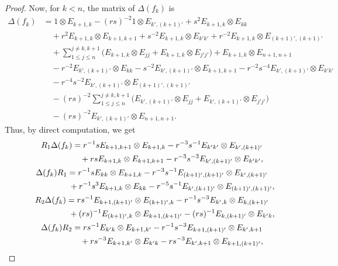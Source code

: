 \documentclass[10pt,a4paper]{amsart}
\numberwithin{equation}{section}
\begin{document}
\begin{proof}
Now, for $k < n$, the matrix of $\Delta(f_{k})$ is
\begin{align*}
 \Delta(f_{k}) &{}= 1 \otimes E_{k + 1,k} - (rs)^{-2}1 \otimes E_{k',(k + 1)'} + s^{2}E_{k + 1,k} \otimes E_{kk} \\
 &\quad{} + r^{2}E_{k + 1,k} \otimes E_{k + 1,k + 1} + s^{-2}E_{k + 1,k} \otimes E_{k'k'} + r^{-2}E_{k + 1,k} \otimes E_{(k + 1)',(k+ 1)'} \\
 &\quad{} + \sum_{1\leq j\leq n}^{j\ne k,k + 1} \bigl(E_{k + 1,k} \otimes E_{jj} + E_{k + 1,k} \otimes E_{j'j'}\bigr) + E_{k + 1,k} \otimes E_{n + 1,n + 1} \\
 &\quad{} - r^{-2}E_{k',(k + 1)'} \otimes E_{kk} - s^{-2}E_{k',(k + 1)'} \otimes E_{k + 1,k + 1} - r^{-2}s^{-4}E_{k',(k + 1)'} \otimes E_{k'k'} \\
 &\quad{} - r^{-4}s^{-2}E_{k',(k + 1)'} \otimes E_{(k + 1)',(k + 1)'} \\
 &\quad{} -(rs)^{-2}\sum_{1\leq j\leq n}^{j\ne k,k + 1} \bigl(E_{k',(k + 1)'} \otimes E_{jj} + E_{k',(k + 1)'} \otimes E_{j'j'}\bigr) \\
 &\quad{} - (rs)^{-2}E_{k',(k + 1)'} \otimes E_{n + 1,n+1}.
\end{align*}
Thus, by direct computation, we get
\begin{gather*}
 R_{1}\Delta(f_{k}) = r^{-1}sE_{k + 1,k + 1} \otimes E_{k + 1,k} - r^{-3}s^{-1}E_{k'k'} \otimes E_{k',(k + 1)'} \\[0.2mm]
 \hphantom{R_{1}\Delta(f_{k}) =}{}
 + rsE_{k+1,k} \otimes E_{k+1,k + 1} - r^{-3}s^{-3}E_{k',(k + 1)'} \otimes E_{k'k'},
 \\[0.2mm]
 \Delta(f_{k})R_{1} = r^{-1}sE_{kk} \otimes E_{k + 1,k} - r^{-3}s^{-1}E_{(k + 1)',(k + 1)'} \otimes E_{k',(k + 1)'} \\[0.2mm]
 \hphantom{\Delta(f_{k})R_{1} =}{}
 + r^{-1}s^{3}E_{k + 1,k} \otimes E_{kk} - r^{-5}s^{-1}E_{k',(k + 1)'} \otimes E_{(k + 1)',(k + 1)'},
\\[0.2mm]
 R_{2}\Delta(f_{k}) = rs^{-1}E_{k + 1,(k + 1)'} \otimes E_{(k + 1)',k} - r^{-1}s^{-3}E_{k',k} \otimes E_{k,(k + 1)'} \\[0.2mm]
 \hphantom{R_{2}\Delta(f_{k}) =}{}
 + (rs)^{-1}E_{(k + 1)',k} \otimes E_{k + 1,(k + 1)'} - (rs)^{-1}E_{k,(k + 1)'} \otimes E_{k'k},
 \\[0.2mm]
 \Delta(f_{k})R_{2} = rs^{-1}E_{k'k} \otimes E_{k + 1,k'} - r^{-1}s^{-3}E_{k + 1,(k + 1)'} \otimes E_{k',k + 1} \\[0.2mm]
 \hphantom{\Delta(f_{k})R_{2}=}{} + rs^{-3}E_{k + 1,k'} \otimes E_{k'k} - rs^{-3}E_{k',k + 1} \otimes E_{k + 1,(k + 1)'},

\end{gather*}
\end{proof}
\end{document}
